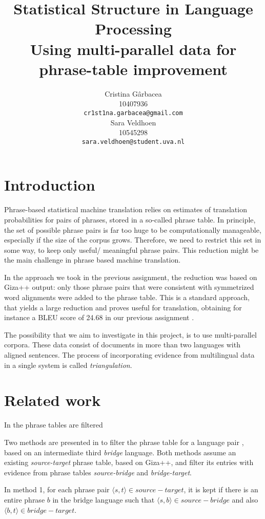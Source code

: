 \documentclass[11pt]{article}
\title{Statistical Structure in Language Processing \\Using multi-parallel data for phrase-table improvement}
\author{ Cristina G\^arbacea\\
  10407936 \\
  {\small \tt cr1st1na.garbacea@gmail.com} 
  \\\And
  Sara Veldhoen \\
10545298   \\
  {\small \tt sara.veldhoen@student.uva.nl} \\}
\date{}
\begin{document}
\maketitle


\section{Introduction}
Phrase-based statistical machine translation relies on estimates of translation probabilities for pairs of phrases, stored in a so-called phrase table.
In principle, the set of possible phrase pairs is far too huge to be computationally manageable, especially if the size of the corpus grows.
Therefore, we need to restrict this set in some way, to keep only useful/ meaningful phrase pairs. This reduction might be the main challenge in phrase based machine translation.

In the approach we took in the previous assignment, the reduction was based on Giza++ output: only those phrase pairs that were consistent with symmetrized word alignments were added to the phrase table. This is a standard approach, that yields a large reduction and proves useful for translation, obtaining for instance a BLEU score of 24.68 in our previous assignment \cite{previous}.

The possibility that we aim to investigate in this project, is to use multi-parallel corpora. These data consist of documents in more than two languages with aligned sentences. The process of incorporating evidence from multilingual data in a single system is called \emph{triangulation}. 

\section{Related work}

In \cite{johnson} the phrase tables  are filtered

Two methods are presented in \cite{chen} to filter the phrase table for a language pair%
, based on an intermediate third \emph{bridge} language. 
 Both methods assume an existing {\em source-target} phrase table, based on Giza++, and filter its entries with evidence from phrase tables {\em source-bridge} and {\em bridge-target}.

In method 1, for each phrase pair $\langle s, t\rangle \in source-target$, it is kept if there is an entire phrase $b$ in the bridge language such that $\langle s,b\rangle \in source-bridge$ and also $\langle b,t\rangle \in bridge-target$.
\end{document}
